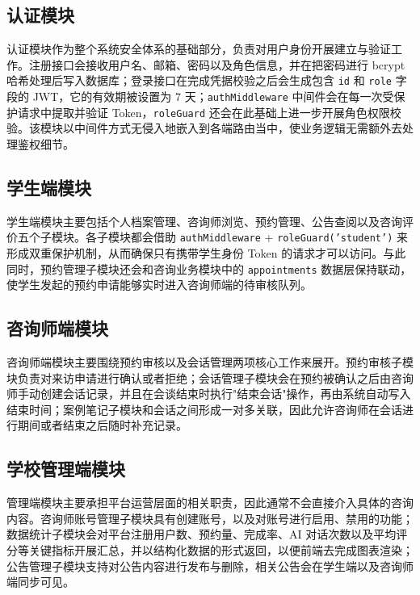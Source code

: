 \subsection{认证模块}

认证模块作为整个系统安全体系的基础部分，负责对用户身份开展建立与验证工作。注册接口会接收用户名、邮箱、密码以及角色信息，并在把密码进行 bcrypt 哈希处理后写入数据库；登录接口在完成凭据校验之后会生成包含 \texttt{id} 和 \texttt{role} 字段的 JWT，它的有效期被设置为 7 天；\texttt{authMiddleware} 中间件会在每一次受保护请求中提取并验证 Token，\texttt{roleGuard} 还会在此基础上进一步开展角色权限校验。该模块以中间件方式无侵入地嵌入到各端路由当中，使业务逻辑无需额外去处理鉴权细节。

\subsection{学生端模块}

学生端模块主要包括个人档案管理、咨询师浏览、预约管理、公告查阅以及咨询评价五个子模块。各子模块都会借助 \texttt{authMiddleware} + \texttt{roleGuard('student')} 来形成双重保护机制，从而确保只有携带学生身份 Token 的请求才可以访问。与此同时，预约管理子模块还会和咨询业务模块中的 \texttt{appointments} 数据层保持联动，使学生发起的预约申请能够实时进入咨询师端的待审核队列。

\subsection{咨询师端模块}

咨询师端模块主要围绕预约审核以及会话管理两项核心工作来展开。预约审核子模块负责对来访申请进行确认或者拒绝；会话管理子模块会在预约被确认之后由咨询师手动创建会话记录，并且在会谈结束时执行"结束会话"操作，再由系统自动写入结束时间；案例笔记子模块和会话之间形成一对多关联，因此允许咨询师在会话进行期间或者结束之后随时补充记录。

\subsection{学校管理端模块}

管理端模块主要承担平台运营层面的相关职责，因此通常不会直接介入具体的咨询内容。咨询师账号管理子模块具有创建账号，以及对账号进行启用、禁用的功能；数据统计子模块会对平台注册用户数、预约量、完成率、AI 对话次数以及平均评分等关键指标开展汇总，并以结构化数据的形式返回，以便前端去完成图表渲染；公告管理子模块支持对公告内容进行发布与删除，相关公告会在学生端以及咨询师端同步可见。

